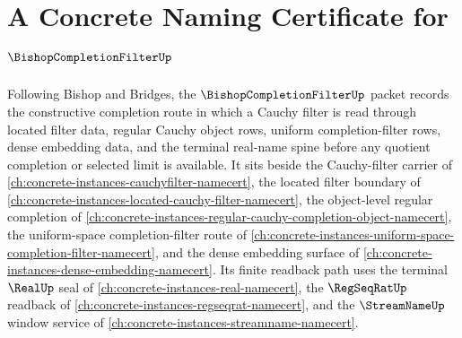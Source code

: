 \chapter{A Concrete Naming Certificate for $\BishopCompletionFilterUp$}
\label{ch:concrete-instances-bishop-completion-filter-namecert}

Following Bishop and Bridges, the $\BishopCompletionFilterUp$ packet records the constructive completion route in which a Cauchy filter is read through located filter data, regular Cauchy object rows, uniform completion-filter rows, dense embedding data, and the terminal real-name spine before any quotient completion or selected limit is available. It sits beside the Cauchy-filter carrier of \autoref{ch:concrete-instances-cauchyfilter-namecert}, the located filter boundary of \autoref{ch:concrete-instances-located-cauchy-filter-namecert}, the object-level regular completion of \autoref{ch:concrete-instances-regular-cauchy-completion-object-namecert}, the uniform-space completion-filter route of \autoref{ch:concrete-instances-uniform-space-completion-filter-namecert}, and the dense embedding surface of \autoref{ch:concrete-instances-dense-embedding-namecert}. Its finite readback path uses the terminal $\RealUp$ seal of \autoref{ch:concrete-instances-real-namecert}, the $\RegSeqRatUp$ readback of \autoref{ch:concrete-instances-regseqrat-namecert}, and the $\StreamNameUp$ window service of \autoref{ch:concrete-instances-streamname-namecert}.

